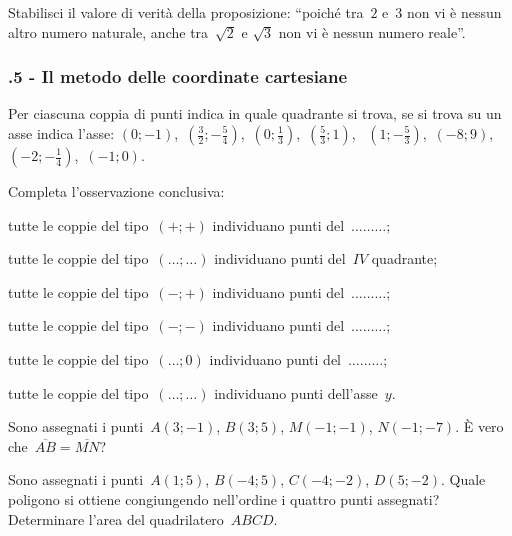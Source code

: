 \begin{esercizio}
\label{ese:D.17}
Stabilisci il valore di verità della proposizione: ``poiché tra~$2$ e~$3$ non vi è nessun altro numero naturale, anche tra~$\sqrt{2}$ e
$\sqrt{3}$ non vi è nessun numero reale''.
\end{esercizio}

\subsubsection*{\thechapter.5 - Il metodo delle coordinate cartesiane}
\begin{esercizio}
\label{ese:D.18}
Per ciascuna coppia di punti indica in quale quadrante si trova, se si trova su un asse indica l'asse:
$(0;-1)$, \,$\left(\frac{3}{2};-\frac{5}{4}\right)$, \,$\left(0;\frac{1}{3}\right)$, \,$\left(\frac{5}{3};1\right)$, \,
$\left(1;-\frac{5}{3}\right)$, \,$(-8;9)$, \,$\left(-2;-\frac{1}{4}\right)$, \,$(-1;0)$.

Completa l'osservazione conclusiva:
\begin{itemize*}
\item tutte le coppie del tipo~$(+;+)$ individuano punti del~$\ldots \ldots \ldots$;
\item tutte le coppie del tipo~$(\ldots;\ldots)$ individuano punti del~$IV$ quadrante;
\item tutte le coppie del tipo~$(-;+)$ individuano punti del~$\ldots \ldots \ldots$;
\item tutte le coppie del tipo~$(-;-)$ individuano punti del~$\ldots \ldots \ldots$;
\item tutte le coppie del tipo~$(\ldots;0)$ individuano punti del~$\ldots \ldots \ldots$;
\item tutte le coppie del tipo~$(\ldots;\ldots)$ individuano punti dell'asse~$y$.
\end{itemize*}
\end{esercizio}

\begin{esercizio}
\label{ese:D.19}
Sono assegnati i punti~$A(3;-1)$, $B(3;5)$, $M(-1;-1)$, $N(-1;-7)$. È vero che~$\overline{AB}=\overline{MN}$?
\end{esercizio}

\begin{esercizio}
\label{ese:D.20}
Sono assegnati i punti~$A(1;5)$, $B(-4;5)$, $C(-4;-2)$, $D(5;-2)$. Quale poligono si ottiene congiungendo nell'ordine i quattro
punti assegnati? Determinare l'area del quadrilatero~$ABCD$.
\end{esercizio}


